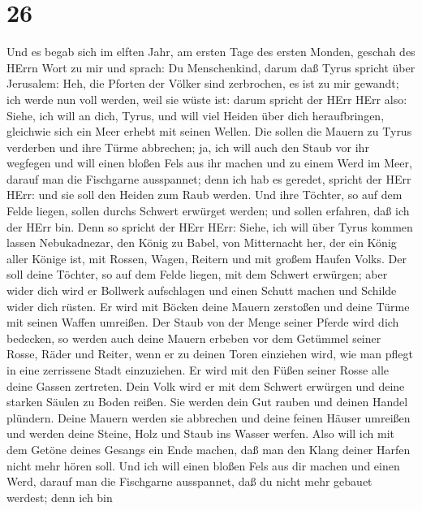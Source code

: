 \hypertarget{section-25}{%
\section{26}\label{section-25}}

 Und es begab sich im elften Jahr, am ersten Tage des ersten
Monden, geschah des HErrn Wort zu mir und sprach:  Du
Menschenkind, darum daß Tyrus spricht über Jerusalem: Heh, die Pforten
der Völker sind zerbrochen, es ist zu mir gewandt; ich werde nun voll
werden, weil sie wüste ist:  darum spricht der HErr HErr
also: Siehe, ich will an dich, Tyrus, und will viel Heiden über dich
heraufbringen, gleichwie sich ein Meer erhebt mit seinen Wellen.
 Die sollen die Mauern zu Tyrus verderben und ihre Türme
abbrechen; ja, ich will auch den Staub vor ihr wegfegen und will einen
bloßen Fels aus ihr machen  und zu einem Werd im Meer,
darauf man die Fischgarne ausspannet; denn ich hab es geredet, spricht
der HErr HErr: und sie soll den Heiden zum Raub werden.  Und
ihre Töchter, so auf dem Felde liegen, sollen durchs Schwert erwürget
werden; und sollen erfahren, daß ich der HErr bin.  Denn so
spricht der HErr HErr: Siehe, ich will über Tyrus kommen lassen
Nebukadnezar, den König zu Babel, von Mitternacht her, der ein König
aller Könige ist, mit Rossen, Wagen, Reitern und mit großem Haufen
Volks.  Der soll deine Töchter, so auf dem Felde liegen, mit
dem Schwert erwürgen; aber wider dich wird er Bollwerk aufschlagen und
einen Schutt machen und Schilde wider dich rüsten.  Er wird
mit Böcken deine Mauern zerstoßen und deine Türme mit seinen Waffen
umreißen.  Der Staub von der Menge seiner Pferde wird dich
bedecken, so werden auch deine Mauern erbeben vor dem Getümmel seiner
Rosse, Räder und Reiter, wenn er zu deinen Toren einziehen wird, wie man
pflegt in eine zerrissene Stadt einzuziehen.  Er wird mit
den Füßen seiner Rosse alle deine Gassen zertreten. Dein Volk wird er
mit dem Schwert erwürgen und deine starken Säulen zu Boden reißen.
 Sie werden dein Gut rauben und deinen Handel plündern.
Deine Mauern werden sie abbrechen und deine feinen Häuser umreißen und
werden deine Steine, Holz und Staub ins Wasser werfen. 
Also will ich mit dem Getöne deines Gesangs ein Ende machen, daß man den
Klang deiner Harfen nicht mehr hören soll.  Und ich will
einen bloßen Fels aus dir machen und einen Werd, darauf man die
Fischgarne ausspannet, daß du nicht mehr gebauet werdest; denn ich bin
